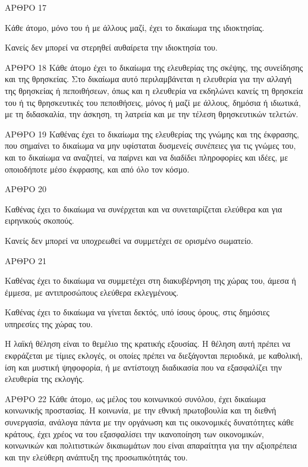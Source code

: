 \documentclass{report}
\begin{document}
      ΑΡΘΡΟ 17


            Κάθε άτομο, μόνο του ή με άλλους μαζί, έχει το δικαίωμα της ιδιοκτησίας.


            Κανείς δεν μπορεί να στερηθεί αυθαίρετα την ιδιοκτησία του.



      ΑΡΘΡΟ 18
      Κάθε άτομο έχει το δικαίωμα της ελευθερίας της σκέψης, της συνείδησης και της θρησκείας. Στο δικαίωμα αυτό περιλαμβάνεται η ελευθερία για την αλλαγή της θρησκείας ή πεποιθήσεων, όπως και η ελευθερία να εκδηλώνει κανείς τη θρησκεία του ή τις θρησκευτικές του πεποιθήσεις, μόνος ή μαζί με άλλους, δημόσια ή ιδιωτικά, με τη διδασκαλία, την άσκηση, τη λατρεία και με την τέλεση θρησκευτικών τελετών.

      ΑΡΘΡΟ 19
      Καθένας έχει το δικαίωμα της ελευθερίας της γνώμης και της έκφρασης, που σημαίνει το δικαίωμα να μην υφίσταται δυσμενείς συνέπειες για τις γνώμες του, και το δικαίωμα να αναζητεί, να παίρνει και να διαδίδει πληροφορίες και ιδέες, με οποιοδήποτε μέσο έκφρασης, και από όλο τον κόσμο.

      ΑΡΘΡΟ 20


            Καθένας έχει το δικαίωμα να συνέρχεται και να συνεταιρίζεται ελεύθερα και για ειρηνικούς σκοπούς.


            Κανείς δεν μπορεί να υποχρεωθεί να συμμετέχει σε ορισμένο σωματείο.



      ΑΡΘΡΟ 21


            Καθένας έχει το δικαίωμα να συμμετέχει στη διακυβέρνηση της χώρας του, άμεσα ή έμμεσα, με αντιπροσώπους ελεύθερα εκλεγμένους.


            Καθένας έχει το δικαίωμα να γίνεται δεκτός, υπό ίσους όρους, στις δημόσιες υπηρεσίες της χώρας του.


            Η λαϊκή θέληση είναι το θεμέλιο της κρατικής εξουσίας. Η θέληση αυτή πρέπει να εκφράζεται με τίμιες εκλογές, οι οποίες πρέπει να διεξάγονται περιοδικά, με καθολική, ίση και μυστική ψηφοφορία, ή με αντίστοιχη διαδικασία που να εξασφαλίζει την ελευθερία της εκλογής.



      ΑΡΘΡΟ 22
      Κάθε άτομο, ως μέλος του κοινωνικού συνόλου, έχει δικαίωμα κοινωνικής προστασίας. Η κοινωνία, με την εθνική πρωτοβουλία και τη διεθνή συνεργασία, ανάλογα πάντα με την οργάνωση και τις οικονομικές δυνατότητες κάθε κράτους, έχει χρέος να του εξασφαλίσει την ικανοποίηση των οικονομικών, κοινωνικών και πολιτιστικών δικαιωμάτων που είναι απαραίτητα για την αξιοπρέπεια και την ελεύθερη ανάπτυξη της προσωπικότητάς του.
\end{document}
